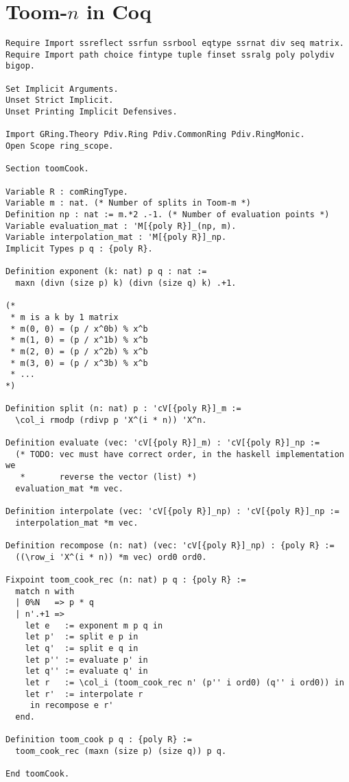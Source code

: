 \documentclass[a4paper]{article}
\begin{document}
\section{Toom-$n$ in Coq}
\begin{verbatim}
Require Import ssreflect ssrfun ssrbool eqtype ssrnat div seq matrix.
Require Import path choice fintype tuple finset ssralg poly polydiv bigop.

Set Implicit Arguments.
Unset Strict Implicit.
Unset Printing Implicit Defensives.

Import GRing.Theory Pdiv.Ring Pdiv.CommonRing Pdiv.RingMonic.
Open Scope ring_scope.

Section toomCook.

Variable R : comRingType.
Variable m : nat. (* Number of splits in Toom-m *)
Definition np : nat := m.*2 .-1. (* Number of evaluation points *)
Variable evaluation_mat : 'M[{poly R}]_(np, m).
Variable interpolation_mat : 'M[{poly R}]_np.
Implicit Types p q : {poly R}.

Definition exponent (k: nat) p q : nat :=
  maxn (divn (size p) k) (divn (size q) k) .+1.

(*
 * m is a k by 1 matrix
 * m(0, 0) = (p / x^0b) % x^b
 * m(1, 0) = (p / x^1b) % x^b
 * m(2, 0) = (p / x^2b) % x^b
 * m(3, 0) = (p / x^3b) % x^b
 * ...
*)

Definition split (n: nat) p : 'cV[{poly R}]_m :=
  \col_i rmodp (rdivp p 'X^(i * n)) 'X^n.

Definition evaluate (vec: 'cV[{poly R}]_m) : 'cV[{poly R}]_np :=
  (* TODO: vec must have correct order, in the haskell implementation we
   *       reverse the vector (list) *)
  evaluation_mat *m vec.

Definition interpolate (vec: 'cV[{poly R}]_np) : 'cV[{poly R}]_np :=
  interpolation_mat *m vec.

Definition recompose (n: nat) (vec: 'cV[{poly R}]_np) : {poly R} :=
  ((\row_i 'X^(i * n)) *m vec) ord0 ord0.

Fixpoint toom_cook_rec (n: nat) p q : {poly R} :=
  match n with
  | 0%N   => p * q
  | n'.+1 =>
    let e   := exponent m p q in
    let p'  := split e p in
    let q'  := split e q in
    let p'' := evaluate p' in
    let q'' := evaluate q' in
    let r   := \col_i (toom_cook_rec n' (p'' i ord0) (q'' i ord0)) in
    let r'  := interpolate r
     in recompose e r'
  end.

Definition toom_cook p q : {poly R} :=
  toom_cook_rec (maxn (size p) (size q)) p q.

End toomCook.
\end{verbatim}
\end{document}

